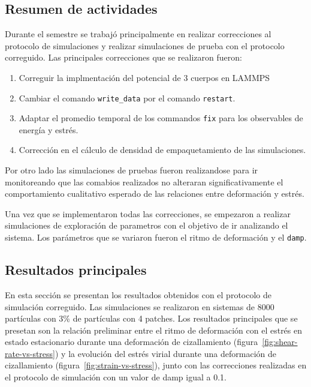 \documentclass[../main.tex]{subfiles}
\begin{document}
\subsection{Resumen de actividades}

Durante el semestre se trabajó principalmente en realizar correcciones al protocolo de simulaciones y realizar simulaciones de prueba con el protocolo correguido.
Las principales correcciones que se realizaron fueron:
\begin{enumerate}
    \item Correguir la implmentación del potencial de 3 cuerpos en LAMMPS
    \item Cambiar el comando \texttt{write\_data} por el comando \texttt{restart}.
    \item Adaptar el promedio temporal de los commandos \texttt{fix} para los observables de energía y estrés.
    \item Corrección en el cálculo de densidad de empaquetamiento de las simulaciones.
\end{enumerate}
Por otro lado las simulaciones de pruebas fueron realizandose para ir monitoreando que las comabios realizados no alteraran significativamente el comportamiento cualitativo esperado de las relaciones entre deformación y estrés.

Una vez que se implementaron todas las correcciones, se empezaron a realizar simulaciones de exploración de parametros con el objetivo de ir analizando el sistema.
Los parámetros que se variaron fueron el ritmo de deformación y el \texttt{damp}.

\subsection{Resultados principales}

En esta sección se presentan los resultados obtenidos con el protocolo de simulación correguido.
Las simulaciones se realizaron en sistemas de \num{8000} partículas con \num{3}\% de partículas con 4 patches.
Los resultados principales que se presetan son la relación preliminar entre el ritmo de deformación con el estrés en estado estacionario durante una deformación de cizallamiento (figura~\ref{fig:shear-rate-vs-stress}) y la evolución del estrés virial durante una deformación de cizallamiento (figura~\ref{fig:strain-vs-stress}), junto con las correcciones realizadas en el protocolo de simulación con un valor de damp igual a \num{0.1}.
\end{document}
